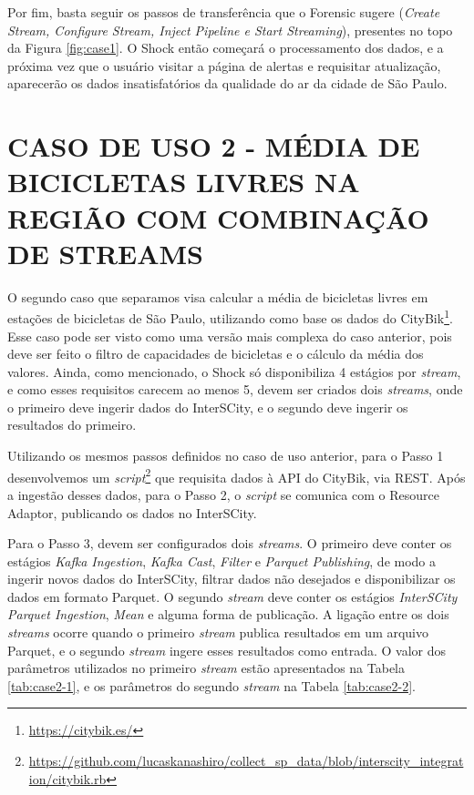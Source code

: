 Por fim, basta seguir os passos de transferência que o Forensic sugere (\textit{Create
Stream, Configure Stream, Inject Pipeline e Start Streaming}), presentes no
topo da Figura \ref{fig:case1}. O Shock então começará o processamento dos
dados, e a próxima vez que o usuário visitar a página de alertas e requisitar
atualização, aparecerão os dados insatisfatórios da qualidade do ar da cidade
de São Paulo.

\section{CASO DE USO 2 - MÉDIA DE BICICLETAS LIVRES NA REGIÃO COM COMBINAÇÃO DE STREAMS}

O segundo caso que separamos visa calcular a média de bicicletas livres em estações
de bicicletas de São Paulo, utilizando como base os dados do
CityBik\footnote{\url{https://citybik.es/}}. Esse caso pode ser visto como uma
versão mais complexa do caso anterior, pois deve ser feito o filtro de
capacidades de bicicletas e o cálculo da média dos valores. Ainda,
como mencionado, o Shock só disponibiliza 4 estágios por
\textit{stream}, e como esses requisitos carecem ao menos 5, devem ser criados
dois \textit{streams}, onde o primeiro deve ingerir dados do InterSCity, e o
segundo deve ingerir os resultados do primeiro.

Utilizando os mesmos passos definidos no caso de uso anterior, para o Passo 1
desenvolvemos um
\textit{script}\footnote{\url{https://github.com/lucaskanashiro/collect_sp_data/blob/interscity_integration/citybik.rb}}
que requisita dados à API do CityBik, via REST. Após a ingestão desses dados,
para o Passo 2, o \textit{script} se comunica com o Resource Adaptor,
publicando os dados no InterSCity.

Para o Passo 3, devem ser configurados dois \textit{streams}. O primeiro deve
conter os estágios \textit{Kafka Ingestion}, \textit{Kafka Cast},
\textit{Filter} e \textit{Parquet Publishing}, de modo a ingerir novos dados
do InterSCity, filtrar dados não desejados e disponibilizar os dados em formato
Parquet. O segundo \textit{stream} deve conter os estágios
\textit{InterSCity Parquet Ingestion}, \textit{Mean} e alguma forma de
publicação. A ligação entre os dois \textit{streams} ocorre quando o primeiro
\textit{stream} publica resultados em um arquivo Parquet, e o segundo
\textit{stream} ingere esses resultados como entrada. O valor dos parâmetros
utilizados no primeiro \textit{stream} estão apresentados na Tabela
\ref{tab:case2-1}, e os parâmetros do segundo \textit{stream} na Tabela
\ref{tab:case2-2}.

